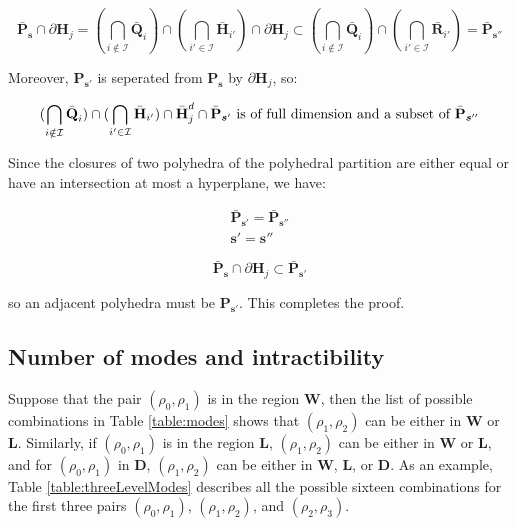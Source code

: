 \begin{equation}
\bar{\textbf{P}}_{\boldsymbol s}\cap \partial \textbf{H}_{j}=(\bigcap_{i\notin \mathcal{I}} \bar{\textbf{Q}}_{i})\cap(\bigcap_{i'\in \mathcal{I}}\bar{\textbf{H}}_{i'})\cap\partial \textbf{H}_{j}\subset (\bigcap_{i\notin \mathcal{I}} \bar{\textbf{Q}}_{i})\cap (\bigcap_{i'\in \mathcal{I}}\bar{\textbf{R}}_{i'})=\bar{\textbf{P}}_{\boldsymbol s''}
\label{eq:adjacency3}
\end{equation}

\noindent Moreover, $\textbf{P}_{\boldsymbol s'}$ is seperated from $\textbf{P}_{\boldsymbol s}$ by $\partial \textbf{H}_{j}$, so:

\begin{equation}
(\bigcap_{i\notin \mathcal{I}} \bar{\textbf{Q}}_{i})\cap(\bigcap_{i'\in \mathcal{I}}\bar{\textbf{H}}_{i'})\cap\bar{\textbf{H}}^{d}_{j}\cap \bar{\textbf{P}}_{\boldsymbol s'} \text{ is of full dimension and a subset of }\bar{\textbf{P}}_{\boldsymbol s''}\\
\label{eq:adjacency4}
\end{equation}

\noindent Since the closures of two polyhedra of the polyhedral partition are either equal or have an intersection at most a hyperplane, we have:

\begin{equation}
\begin{array}{l}
\bar{\textbf{P}}_{\boldsymbol s'}=\bar{\textbf{P}}_{\boldsymbol s''}\\
\boldsymbol s'=\boldsymbol s''
\end{array}
\label{eq:adjacency5}
\end{equation}

\begin{equation}
\bar{\textbf{P}}_{\boldsymbol s}\cap \partial \textbf{H}_{j}\subset \bar{\textbf{P}}_{\boldsymbol s'}
\label{eq:adjacency6}
\end{equation}

\noindent so an adjacent polyhedra must be $\textbf{P}_{\boldsymbol s'}$. This completes the proof.


\subsection{Number of modes and intractibility}\label{sec:modes}

Suppose that the pair $(\rho_{0},\rho_{1})$ is in the region \textbf{W}, then the list of possible combinations in Table \ref{table:modes} shows that $(\rho_{1},\rho_{2})$ can be either in \textbf{W} or \textbf{L}. Similarly, if $(\rho_{0},\rho_{1})$ is in the region \textbf{L}, $(\rho_{1},\rho_{2})$ can be either in \textbf{W} or \textbf{L}, and for $(\rho_{0},\rho_{1})$ in \textbf{D}, $(\rho_{1},\rho_{2})$ can be either in \textbf{W}, \textbf{L}, or \textbf{D}. As an example, Table \ref{table:threeLevelModes} describes all the possible sixteen combinations for the first three pairs $(\rho_{0},\rho_{1})$, $(\rho_{1},\rho_{2})$, and $(\rho_{2},\rho_{3})$.

